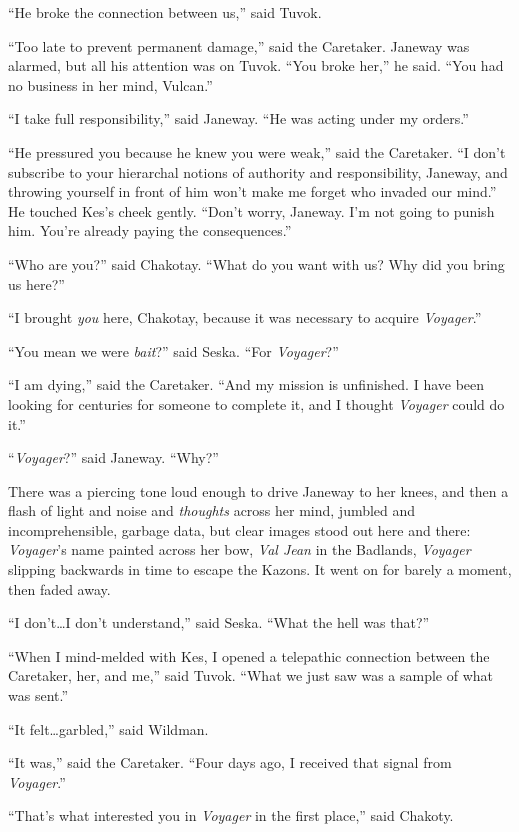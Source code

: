 \documentclass[twoside,letterpaper,12pt]{memoir}
\begin{document}
``He broke the connection between us,'' said Tuvok. 

``Too late to prevent permanent damage,'' said the Caretaker. Janeway was alarmed, but all his attention was on Tuvok. ``You broke her,'' he said. ``You had no business in her mind, Vulcan.'' 

``I take full responsibility,'' said Janeway. ``He was acting under my orders.'' 

``He pressured you because he knew you were weak,'' said the Caretaker. ``I don't subscribe to your hierarchal notions of authority and responsibility, Janeway, and throwing yourself in front of him won't make me forget who invaded our mind.'' He touched Kes's cheek gently. ``Don't worry, Janeway. I'm not going to punish him. You're already paying the consequences.'' 

``Who are you?'' said Chakotay. ``What do you want with us? Why did you bring us here?'' 

``I brought \textit{you} here, Chakotay, because it was necessary to acquire \textit{Voyager}.'' 

``You mean we were \textit{bait}?'' said Seska. ``For \textit{Voyager}?'' 

``I am dying,'' said the Caretaker. ``And my mission is unfinished. I have been looking for centuries for someone to complete it, and I thought \textit{Voyager} could do it.'' 

``\textit{Voyager}?'' said Janeway. ``Why?'' 

There was a piercing tone loud enough to drive Janeway to her knees, and then a flash of light and noise and \textit{thoughts} across her mind, jumbled and incomprehensible, garbage data, but clear images stood out here and there: \textit{Voyager}'s name painted across her bow, \textit{Val Jean} in the Badlands, \textit{Voyager} slipping backwards in time to escape the Kazons. It went on for barely a moment, then faded away. 

``I don't\ldots I don't understand,'' said Seska. ``What the hell was that?'' 

``When I mind-melded with Kes, I opened a telepathic connection between the Caretaker, her, and me,'' said Tuvok. ``What we just saw was a sample of what was sent.'' 

``It felt\ldots garbled,'' said Wildman. 

``It was,'' said the Caretaker. ``Four days ago, I received that signal from \textit{Voyager}.'' 

``That's what interested you in \textit{Voyager} in the first place,'' said Chakoty. 
\end{document}
